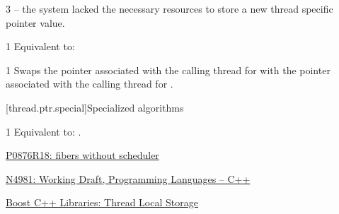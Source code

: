 \documentclass[fontsize=10pt,paper=A4,pagesize,DIV=15]{scrartcl}
\begin{document}
3 \errors
{} -- the system lacked the necessary
resources to store a new thread specific pointer value.


1 \effects
Equivalent to: 


1 \effects
Swaps the pointer associated with the calling thread for \this with the
pointer associated with the calling thread for .

[thread.ptr.special]{Specialized algorithms}

1 \effects
Equivalent to: .

\cbend






\newpage
{}
\begin{thebibliography}{99}

        \href{https://www.open-std.org/jtc1/sc22/wg21/docs/papers/2024/p0876r18.pdf}
        {P0876R18: fibers without scheduler}

        \href{https://www.open-std.org/jtc1/sc22/wg21/docs/papers/2024/n4981.pdf}
        {N4981: Working Draft, Programming Languages -- C++}

        \href{https://www.boost.org/doc/libs/release/doc/html/thread/thread_local_storage.html}
        {Boost C++ Libraries: Thread Local Storage}

\end{thebibliography}

\end{document}
